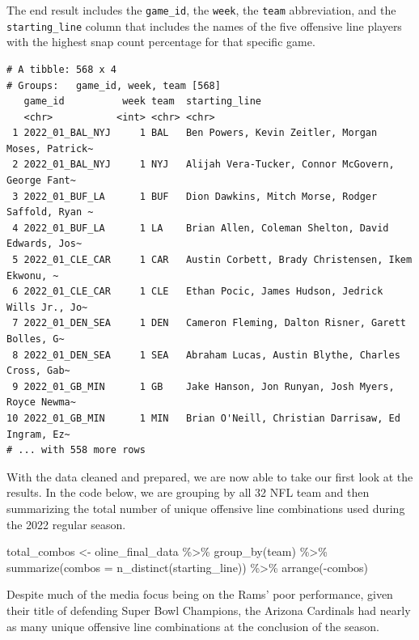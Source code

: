 \documentclass[
  letterpaper,
]{krantz}
\newenvironment{Shaded}{\begin{snugshade}}{\end{snugshade}}
\newcommand{\AttributeTok}[1]{\textcolor[rgb]{0.40,0.45,0.13}{#1}}
\newcommand{\FunctionTok}[1]{\textcolor[rgb]{0.28,0.35,0.67}{#1}}
\newcommand{\NormalTok}[1]{\textcolor[rgb]{0.00,0.23,0.31}{#1}}
\newcommand{\OtherTok}[1]{\textcolor[rgb]{0.00,0.23,0.31}{#1}}
\newcommand{\SpecialCharTok}[1]{\textcolor[rgb]{0.37,0.37,0.37}{#1}}
\begin{document}
The end result includes the \texttt{game\_id}, the \texttt{week}, the
\texttt{team} abbreviation, and the \texttt{starting\_line} column that
includes the names of the five offensive line players with the highest
snap count percentage for that specific game.

\begin{verbatim}
# A tibble: 568 x 4
# Groups:   game_id, week, team [568]
   game_id          week team  starting_line                                    
   <chr>           <int> <chr> <chr>                                            
 1 2022_01_BAL_NYJ     1 BAL   Ben Powers, Kevin Zeitler, Morgan Moses, Patrick~
 2 2022_01_BAL_NYJ     1 NYJ   Alijah Vera-Tucker, Connor McGovern, George Fant~
 3 2022_01_BUF_LA      1 BUF   Dion Dawkins, Mitch Morse, Rodger Saffold, Ryan ~
 4 2022_01_BUF_LA      1 LA    Brian Allen, Coleman Shelton, David Edwards, Jos~
 5 2022_01_CLE_CAR     1 CAR   Austin Corbett, Brady Christensen, Ikem Ekwonu, ~
 6 2022_01_CLE_CAR     1 CLE   Ethan Pocic, James Hudson, Jedrick Wills Jr., Jo~
 7 2022_01_DEN_SEA     1 DEN   Cameron Fleming, Dalton Risner, Garett Bolles, G~
 8 2022_01_DEN_SEA     1 SEA   Abraham Lucas, Austin Blythe, Charles Cross, Gab~
 9 2022_01_GB_MIN      1 GB    Jake Hanson, Jon Runyan, Josh Myers, Royce Newma~
10 2022_01_GB_MIN      1 MIN   Brian O'Neill, Christian Darrisaw, Ed Ingram, Ez~
# ... with 558 more rows
\end{verbatim}

With the data cleaned and prepared, we are now able to take our first
look at the results. In the code below, we are grouping by all 32 NFL
team and then summarizing the total number of unique offensive line
combinations used during the 2022 regular season.

\begin{Shaded}
\begin{Highlighting}[]
\NormalTok{total\_combos }\OtherTok{\textless{}{-}}\NormalTok{ oline\_final\_data }\SpecialCharTok{\%\textgreater{}\%}
  \FunctionTok{group\_by}\NormalTok{(team) }\SpecialCharTok{\%\textgreater{}\%}
  \FunctionTok{summarize}\NormalTok{(}\AttributeTok{combos =} \FunctionTok{n\_distinct}\NormalTok{(starting\_line)) }\SpecialCharTok{\%\textgreater{}\%}
  \FunctionTok{arrange}\NormalTok{(}\SpecialCharTok{{-}}\NormalTok{combos)}
\end{Highlighting}
\end{Shaded}

Despite much of the media focus being on the Rams' poor performance,
given their title of defending Super Bowl Champions, the Arizona
Cardinals had nearly as many unique offensive line combinations at the
conclusion of the season.
\end{document}
